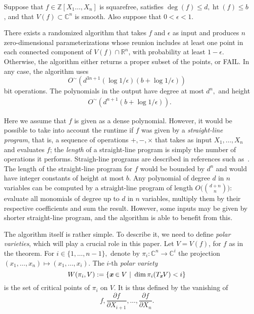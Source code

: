 \documentclass[sigconf]{acmart}
\def\xb{\textit{\textbf{x}}}
\DeclareMathOperator{\htt}{ht}
\def\C{\mathbb{C}}
\def\R{\mathbb{R}}
\def\pa{\partial}
\newcommand{\ZZ}{{\mathbb{Z}}}
\begin{document}
\begin{theorem}\label{theo:main}
  Suppose that $f\in\ZZ[X_1\hdots,X_n]$ is squarefree, satisfies
  $\deg(f) \leq d, \htt(f) \leq b$, and that $V(f) \subset \C^n$ is
  smooth. Also suppose that $0 < \epsilon < 1.$

  There exists a randomized algorithm that takes $f$ and $\epsilon$
  as input and produces $n$ zero-dimensional parameterizations whose reunion includes at least one point in each connected component of
  $V(f) \cap \R^n$, with probability at least $1-\epsilon$. Otherwise, 
  the algorithm either returns a proper subset of the points, or FAIL.  In
  any case, the algorithm uses
  \[
O^{\sim}(d^{3n+1}(\log1/\epsilon)(b + \log1/\epsilon))
  \]
  bit operations. The polynomials in
  the output have degree at most $d^n,$ and height 
  \begin{align*}
  &O^{\sim}(d^{n+1}(b + \log 1 / \epsilon)). 
  \end{align*}
\end{theorem}

Here we assume that $f$ is given as a dense polynomial. However, it 
would be possible to take into account the runtime if $f$ was given 
by a {\em straight-line
  program}, that is, a sequence of operations $+,-,\times$ that takes
as input $X_1,\dots,X_n$ and evaluates $f$; the {\em length} of a
straight-line program is simply the number of operations it performs. Straigh-line programs are described in references such
as~\cite{GiHeMoPa95,GiHaHeMoMoPa97,GiHeMoMoPa98,BaGiHeMb97,EMP}. The length of the straight-line program for $f$ would
be bounded by $d^n$ and would have integer constants of height at most
$b$. Any polynomial of degree $d$ in $n$ variables can be computed by a
straight-line program of length $O\big ({{d+n} \choose n}\big)$:
evaluate all monomials of degree up to $d$ in $n$ variables, multiply
them by their respective coefficients and sum the result. However,
some inputs may be given by shorter straight-line program, and the
algorithm is able to benefit from this.

The algorithm itself is rather simple. To describe it, we need to
define {\em polar varieties}, which will play a crucial role in this
paper. Let $V=V(f)$, for $f$ as in the theorem. For $i \in
\{1,\hdots,n-1\},$ denote by $\pi_i:\C^n \rightarrow \C^i$ the
projection $(x_1,\hdots,x_n) \mapsto (x_1,\hdots,x_i)$.  The $i$-th
\textit{polar variety} \[W(\pi_i,V) := \{\xb \in V~|~\dim \pi_i(T_\xb
V) < i\}\] is the set of critical points of $\pi_i$ on $V$.  It is
thus defined by the vanishing of \[f,\frac{\pa f}{\pa
  X_{i+1}},\hdots,\frac{\pa f}{\pa X_n}.\]
\end{document}
